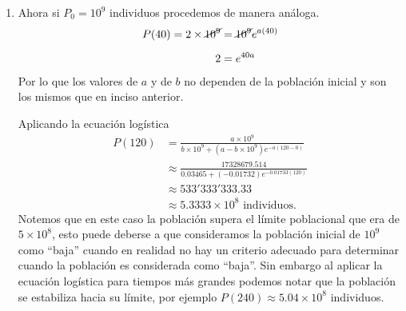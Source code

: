 \documentclass[14pt]{extarticle}
\begin{document}
\begin{enumerate}
{\begin{enumerate}
                \item Ahora si $P_0=10^9$ individuos procedemos de manera
                análoga.
                \begin{align*}
                    P(40)=2\times\cancel{10^9}&=\cancel{10^9}e^{a(40)}\\[.2cm]
                    2 &= e^{40a}
                \end{align*}
                Por lo que los valores de $a$ y de $b$ no dependen de la
                población inicial y son los mismos que en inciso anterior.

                Aplicando la ecuación logística
                \begin{align*}
                    P(120) &= \frac{a\times 10^9}
                    {b\times 10^9+(a-b\times 10^9)e^{-a(120-0)}}\\[.3cm]
                    &\approx \frac{17328679.514}{0.03465+(-0.01732)
                    e^{-0.01733(120)}}\\[.3cm]
                    &\approx 533'333'333.33\\[.2cm]
                    &\approx 5.3333\times 10^8 \text{ individuos.}
                \end{align*}
                Notemos que en este caso la población supera el límite
                poblacional que era de $5\times 10^8$, esto puede deberse a que
                consideramos la población inicial de $10^9$ como ``baja''
                cuando en realidad no hay un criterio adecuado para determinar
                cuando la población es considerada como ``baja''. Sin embargo
                al aplicar la ecuación logística para tiempos más grandes
                podemos notar que la población se estabiliza hacia su límite,
                por ejemplo $P(240)\approx5.04\times 10^8$ individuos.
            \end{enumerate}
        }
    \end{enumerate}
\end{document}
